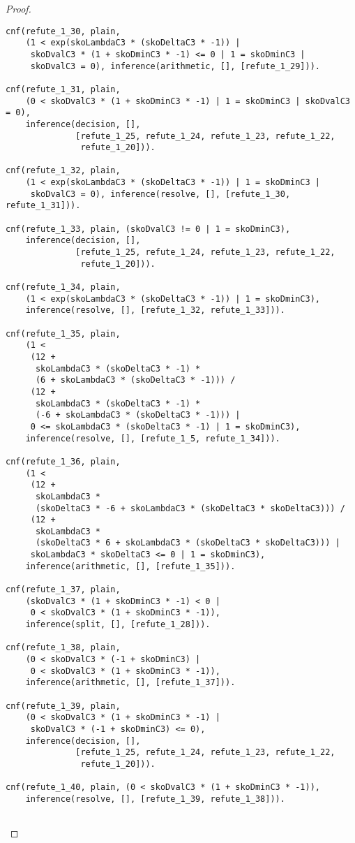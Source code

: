 \begin{proof}
\begin{verbatim}
cnf(refute_1_30, plain,
    (1 < exp(skoLambdaC3 * (skoDeltaC3 * -1)) |
     skoDvalC3 * (1 + skoDminC3 * -1) <= 0 | 1 = skoDminC3 |
     skoDvalC3 = 0), inference(arithmetic, [], [refute_1_29])).

cnf(refute_1_31, plain,
    (0 < skoDvalC3 * (1 + skoDminC3 * -1) | 1 = skoDminC3 | skoDvalC3 = 0),
    inference(decision, [],
              [refute_1_25, refute_1_24, refute_1_23, refute_1_22,
               refute_1_20])).

cnf(refute_1_32, plain,
    (1 < exp(skoLambdaC3 * (skoDeltaC3 * -1)) | 1 = skoDminC3 |
     skoDvalC3 = 0), inference(resolve, [], [refute_1_30, refute_1_31])).

cnf(refute_1_33, plain, (skoDvalC3 != 0 | 1 = skoDminC3),
    inference(decision, [],
              [refute_1_25, refute_1_24, refute_1_23, refute_1_22,
               refute_1_20])).

cnf(refute_1_34, plain,
    (1 < exp(skoLambdaC3 * (skoDeltaC3 * -1)) | 1 = skoDminC3),
    inference(resolve, [], [refute_1_32, refute_1_33])).

cnf(refute_1_35, plain,
    (1 <
     (12 +
      skoLambdaC3 * (skoDeltaC3 * -1) *
      (6 + skoLambdaC3 * (skoDeltaC3 * -1))) /
     (12 +
      skoLambdaC3 * (skoDeltaC3 * -1) *
      (-6 + skoLambdaC3 * (skoDeltaC3 * -1))) |
     0 <= skoLambdaC3 * (skoDeltaC3 * -1) | 1 = skoDminC3),
    inference(resolve, [], [refute_1_5, refute_1_34])).

cnf(refute_1_36, plain,
    (1 <
     (12 +
      skoLambdaC3 *
      (skoDeltaC3 * -6 + skoLambdaC3 * (skoDeltaC3 * skoDeltaC3))) /
     (12 +
      skoLambdaC3 *
      (skoDeltaC3 * 6 + skoLambdaC3 * (skoDeltaC3 * skoDeltaC3))) |
     skoLambdaC3 * skoDeltaC3 <= 0 | 1 = skoDminC3),
    inference(arithmetic, [], [refute_1_35])).

cnf(refute_1_37, plain,
    (skoDvalC3 * (1 + skoDminC3 * -1) < 0 |
     0 < skoDvalC3 * (1 + skoDminC3 * -1)),
    inference(split, [], [refute_1_28])).

cnf(refute_1_38, plain,
    (0 < skoDvalC3 * (-1 + skoDminC3) |
     0 < skoDvalC3 * (1 + skoDminC3 * -1)),
    inference(arithmetic, [], [refute_1_37])).

cnf(refute_1_39, plain,
    (0 < skoDvalC3 * (1 + skoDminC3 * -1) |
     skoDvalC3 * (-1 + skoDminC3) <= 0),
    inference(decision, [],
              [refute_1_25, refute_1_24, refute_1_23, refute_1_22,
               refute_1_20])).

cnf(refute_1_40, plain, (0 < skoDvalC3 * (1 + skoDminC3 * -1)),
    inference(resolve, [], [refute_1_39, refute_1_38])).


\end{verbatim}
\end{proof}
